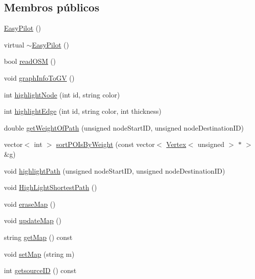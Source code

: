 \subsection*{Membros públicos}
\begin{DoxyCompactItemize}
\item 
\hyperlink{class_easy_pilot_a724cc31f52fb07f5f86a3f71592ceed6}{Easy\+Pilot} ()
\item 
virtual \hyperlink{class_easy_pilot_af9dbdf328d32b3aa70de94f973335d6d}{$\sim$\+Easy\+Pilot} ()
\item 
bool \hyperlink{class_easy_pilot_a64817c638d599dc3b8d9c833a7ce33fc}{read\+O\+S\+M} ()
\item 
void \hyperlink{class_easy_pilot_a1390dbc215f3376a9954f89c52c3cc32}{graph\+Info\+To\+G\+V} ()
\item 
int \hyperlink{class_easy_pilot_a640864406bf361499e587764410c87e2}{highlight\+Node} (int id, string color)
\item 
int \hyperlink{class_easy_pilot_a1a020d88e153d05a4e68a258b420eaa3}{highlight\+Edge} (int id, string color, int thickness)
\item 
double \hyperlink{class_easy_pilot_a93f291c61c81fc5dbb46bfff63eb65ed}{get\+Weight\+Of\+Path} (unsigned node\+Start\+I\+D, unsigned node\+Destination\+I\+D)
\item 
vector$<$ int $>$ \hyperlink{class_easy_pilot_a457e255691b25063652a589b598e1ae5}{sort\+P\+O\+Is\+By\+Weight} (const vector$<$ \hyperlink{class_vertex}{Vertex}$<$ unsigned $>$ $\ast$ $>$ \&g)
\item 
void \hyperlink{class_easy_pilot_a4e992fbc635e8505a3b9596a017455d4}{highlight\+Path} (unsigned node\+Start\+I\+D, unsigned node\+Destination\+I\+D)
\item 
void \hyperlink{class_easy_pilot_a8470b9065378edc35c6ef71fff45affb}{High\+Light\+Shortest\+Path} ()
\item 
void \hyperlink{class_easy_pilot_ae885f727e3d2af5713f795a5b94d1472}{erase\+Map} ()
\item 
void \hyperlink{class_easy_pilot_a14b0155023bbf1318c2f033d3c015102}{update\+Map} ()
\item 
string \hyperlink{class_easy_pilot_aed5bc5d07b19f6c4ed75738c85fd9cd0}{get\+Map} () const 
\item 
void \hyperlink{class_easy_pilot_ad39f859cf5dcc2b1d8c97e1cb098b1af}{set\+Map} (string m)
\item 
int \hyperlink{class_easy_pilot_a41d023b67a6e3d2ee303cc8e65b326ed}{getsource\+I\+D} () const 
\item 

\end{DoxyCompactItemize}
